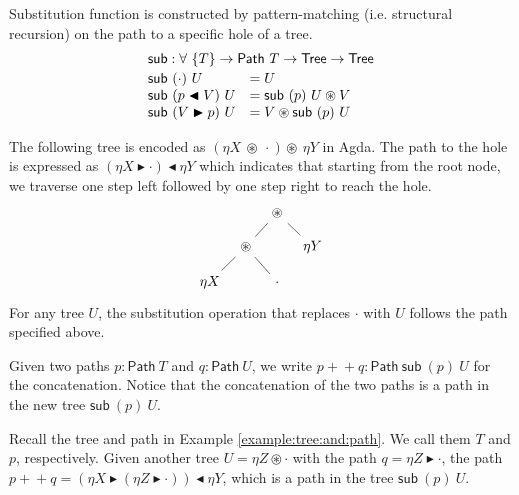 \documentclass[runningheads]{llncs}
\newcommand{\cdast}{\circledast}
\newcommand{\btleft}{\blacktriangleleft}
\newcommand{\btright}{\blacktriangleright}
\newcommand{\Tree}{\mathsf{Tree}}
\newcommand{\path}[1]{\mathsf{Path} ~ #1}
\newcommand{\Sub}{\mathsf{sub}}
\newcommand{\sub}[2]{\mathsf{sub} ~ (#1) ~ #2}
\begin{document}
Substitution function is constructed by pattern-matching (i.e. structural recursion) on the path to a specific hole of a tree.
\[
\begin{array}{ll}
  \multicolumn{2}{l}{\Sub : \forall ~ \{T\} \to \path{T} \to \Tree \to \Tree}
  \\[2pt]
  \sub{\cdot}{U} &= U
  \\
  \sub{p \btleft V}{U} &= \sub{p}{U} \cdast V
  \\
  \sub{V \btright p}{U} &= V \cdast \sub{p}{U} 
\end{array}
\]

\begin{example}\label{example:tree:and:path}
The following tree is encoded as $(\eta X ~ \cdast ~ \cdot) \cdast ~ \eta Y$ in Agda.
The path to the hole is expressed as $(\eta X \btright \cdot) \btleft \eta Y$ which indicates that starting from the root node, we traverse one step left followed by one step right to reach the hole.
\[
\begin{tikzcd}[sep=tiny]
	&& \cdast \\
	\\
	& \cdast && {\eta Y} \\
	\\
	{\eta X} && \cdot
	\arrow[no head, from=1-3, to=3-2]
	\arrow[no head, from=1-3, to=3-4]
	\arrow[no head, from=3-2, to=5-1]
	\arrow[no head, from=3-2, to=5-3]
\end{tikzcd}
\]
For any tree $U$, the substitution operation that replaces $\cdot$ with $U$ follows the path specified above.
\end{example}
Given two paths $p : \path{T}$ and $q : \path{U}$, we write $p +\!\!+ q : \path{\sub{p}{U}}$ for the concatenation.
Notice that the concatenation of the two paths is a path in the new tree $\sub{p}{U}$.
\begin{example}\label{example:path:concatenation}
  Recall the tree and path in Example \ref{example:tree:and:path}. We call them $T$ and $p$, respectively.
  Given another tree $U = \eta Z \cdast \cdot$ with the path $q = \eta Z \btright \cdot$, the path $p +\!\!+ q = (\eta X \btright (\eta Z \btright \cdot)) \btleft \eta Y$, which is a path in the tree $\sub{p}{U}$.
\end{example}
\end{document}
